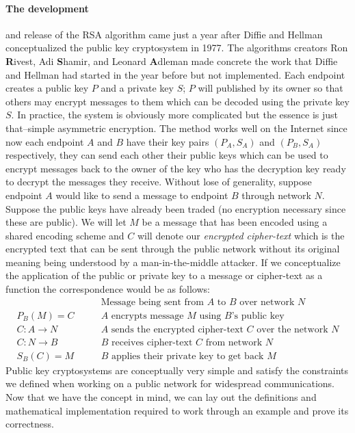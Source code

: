 \documentclass[12pt]{article}
\begin{document}
\paragraph{The development} and release of the RSA algorithm came just a year after Diffie and Hellman conceptualized the public key cryptosystem in 1977.  The algorithms creators Ron \textbf{R}ivest, Adi \textbf{S}hamir, and Leonard \textbf{A}dleman made concrete the work that Diffie and Hellman had started in the year before but not implemented.  Each endpoint creates a public key $P$ and a private key $S$; $P$ will published by its owner so that others may encrypt messages to them which can be decoded using the private key $S$.  In practice, the system is obviously more complicated but the essence is just that--simple asymmetric encryption.  The method works well on the Internet since now each endpoint $A$ and $B$ have their key pairs $(P_A,S_A)$ and $(P_B, S_A)$ respectively, they can send each other their public keys which can be used to encrypt messages back to the owner of the key who has the decryption key ready to decrypt the messages they receive.  Without lose of generality, suppose endpoint $A$ would like to send a message to endpoint $B$ through network $N$.  Suppose the public keys have already been traded (no encryption necessary since these are public).  We will let $M$ be a message that has been encoded using a shared encoding scheme and $C$ will denote our \textit{encrypted cipher-text} which is the encrypted text that can be sent through the public network without its original meaning being understood by a man-in-the-middle attacker.  If we conceptualize the application of the public or private key to a message or cipher-text as a function the correspondence would be as follows:
\begin{align*}
&\qquad\text{Message being sent from $A$ to $B$ over network $N$}\\
P_B(M)=C	&\qquad\text{$A$ encrypts message $M$ using $B$'s public key}\\
C: A\rightarrow N	&\qquad\text{$A$ sends the encrypted cipher-text $C$ over the network $N$}\\
C: N\rightarrow B	&\qquad\text{$B$ receives cipher-text $C$ from network $N$}\\
S_B(C)=M	&\qquad\text{$B$ applies their private key to get back $M$} 
\end{align*}
Public key cryptosystems are conceptually very simple and satisfy the constraints we defined when working on a public network for widespread communications.  Now that we have the concept in mind, we can lay out the definitions and mathematical implementation required to work through an example and prove its correctness.
\end{document}
